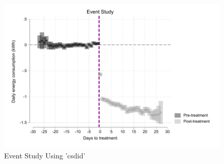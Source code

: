 \documentclass{article}
\begin{document}
\begin{figure}
    \centering
    \includegraphics{homework 6/output/figure/event_study_csdid.pdf}
    \caption{Event Study  Using 'csdid'}
    \label{fig:eventstudy3}
\end{figure}
\end{document}
